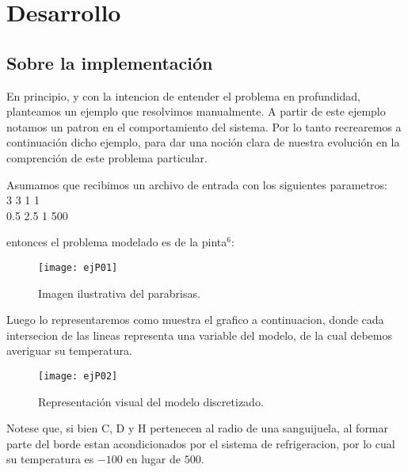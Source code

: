 \section{Desarrollo}

\subsection{Sobre la implementaci\'on}
En principio, y con la intencion de entender el problema en profundidad, planteamos un ejemplo que resolvimos manualmente. A partir de este ejemplo
notamos un patron en el comportamiento del sistema. Por lo tanto recrearemos a continuaci\'on dicho ejemplo, para dar una noci\'on clara de nuestra 
evoluci\'on en la comprenci\'on de este problema particular.

Asumamos que recibimos un archivo de entrada con los siguientes parametros:\\
3 3 1 1\\
0.5 2.5 1 500

entonces el problema modelado es de la pinta$^6$:

\begin{figure}[H]
    \texttt{[image: ejP01]}
    \caption{Imagen ilustrativa del parabrisas.}
\end{figure}
Luego lo representaremos como muestra el grafico a continuacion, donde cada intersecion de las lineas representa una variable del modelo, de la cual
debemos averiguar su temperatura.
\begin{figure}[H]
    \texttt{[image: ejP02]}
    \caption{Representaci\'on visual del modelo discretizado.}
\end{figure}

Notese que, si bien C, D y H pertenecen al radio de una sanguijuela, al formar parte del borde estan acondicionados por el sistema de refrigeracion,
por lo cual su temperatura es $-100$ en lugar de $500$.

